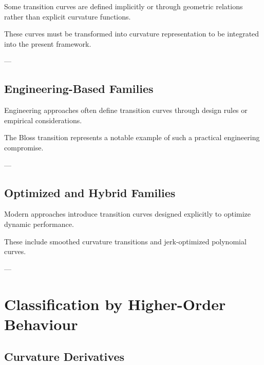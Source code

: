 \begin{remark}
Some transition curves are defined implicitly or through geometric
relations rather than explicit curvature functions.
\end{remark}

\begin{remark}
These curves must be transformed into curvature representation to be
integrated into the present framework.
\end{remark}

---

\subsection{Engineering-Based Families}

\begin{remark}
Engineering approaches often define transition curves through design
rules or empirical considerations.
\end{remark}

\begin{remark}
The Bloss transition represents a notable example of such a practical
engineering compromise.
\end{remark}

---

\subsection{Optimized and Hybrid Families}

\begin{remark}
Modern approaches introduce transition curves designed explicitly to
optimize dynamic performance.
\end{remark}

\begin{remark}
These include smoothed curvature transitions and jerk-optimized
polynomial curves.
\end{remark}

---

\section{Classification by Higher-Order Behaviour}

\subsection{Curvature Derivatives}

